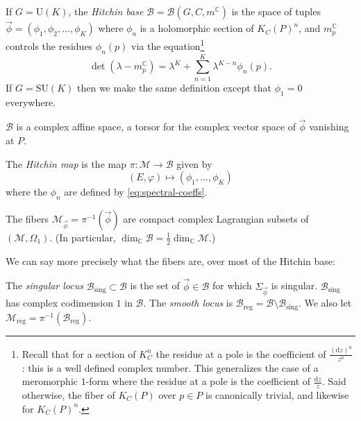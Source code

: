 \documentclass[12pt,letterpaper,reqno]{article}
\numberwithin{equation}{section}
\newcommand{\cB}{\ensuremath{\mathcal B}}
\newcommand{\cM}{\ensuremath{\mathcal M}}
\newcommand{\C}{\ensuremath{\mathbb C}}
\newcommand{\half}{\ensuremath{\frac{1}{2}}}
\newcommand{\de}{\mathrm{d}}
\newcommand{\sing}{\mathrm{sing}}
\newcommand{\reg}{\mathrm{reg}}
\newcommand{\vphi}{{\vec\phi}}
\newcommand{\ti}[1]{\textit{#1}}
\newcommand{\SU}{\mathrm{SU}}
\newcommand{\U}{\mathrm{U}}
\newcommand{\fixme}[1]{{\color{orange}{[#1]}}}
\begin{document}
\begin{defn}
If $G = \U(K)$,
the \ti{Hitchin base} $\cB = \cB(G,C,m^\C)$ is
the space of tuples $\vphi = (\phi_1, \phi_2, \dots, \phi_K)$
where $\phi_n$ is a holomorphic section of $K_C(P)^n$,
and $m_p^\C$ controls the residues $\phi_n(p)$ via the equation\footnote{Recall that for a section of $K_C^n$ the residue at a pole is the coefficient of $\frac{(\de z)^n}{z^n}$: this is a well
defined complex number. This generalizes the case of a meromorphic $1$-form
where the residue at a pole is the coefficient of $\frac{\de z}{z}$. Said otherwise, the fiber of
$K_C(P)$ over $p \in P$ is canonically trivial,
and likewise for $K_C(P)^n$.}
\begin{equation}
  \det (\lambda - m_p^\C) = \lambda^K + \sum_{n=1}^K \lambda^{K-n} \phi_n(p).
\end{equation}
If $G = \SU(K)$ then we make the same definition except that
$\phi_1 = 0$ everywhere.
\end{defn}

$\cB$ is a complex affine space, a torsor for the complex vector space
of $\vphi$ vanishing at $P$.

\begin{defn}
The \ti{Hitchin map} is the map $\pi: \cM \to \cB$ given by
\begin{equation}
  (E, \varphi) \mapsto (\phi_1, \dots, \phi_K)
\end{equation}
where the $\phi_n$ are defined by \eqref{eq:spectral-coeffs}.
\end{defn}

\begin{prop} The fibers
$\cM_\vphi = \pi^{-1}(\vphi)$ 
are compact complex Lagrangian subsets of $(\cM, \Omega_1)$. (In particular, $\dim_\C \cB = \half \dim_\C \cM$.)
\end{prop}

\fixme{say why?}

We can say more precisely what the fibers are,
over most of the Hitchin base:

\begin{defn}
The \ti{singular locus} $\cB_\sing \subset \cB$ is the set of $\vphi \in \cB$
for which $\Sigma_{\vec \phi}$ is singular. $\cB_\sing$ has complex codimension $1$ in $\cB$.
The \ti{smooth locus} is $\cB_\reg = \cB \setminus \cB_\sing$.
We also let $\cM_\reg = \pi^{-1}(\cB_\reg)$.
\end{defn}
\end{document}
